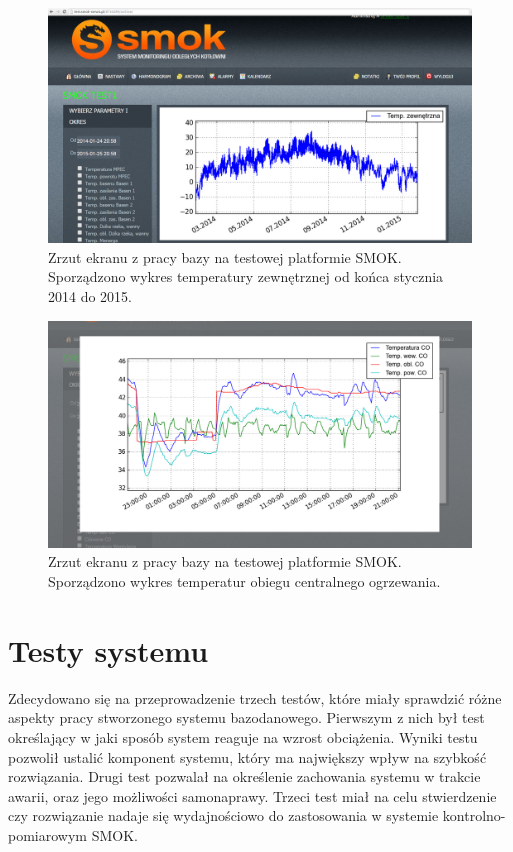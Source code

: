 \documentclass[a4paper,polish,12pt,twoside]{article}
\def \docsection#1{\clearpage\section{#1}}
\begin{document}
	\begin{figure}[H]
		\centering \includegraphics[width=15cm]{smokscreenshot2}
		\caption[Zrzut ekranu z pracy bazy na testowej platformie SMOK]{Zrzut ekranu z pracy bazy na testowej platformie SMOK. Sporządzono wykres temperatury zewnętrznej od końca stycznia 2014 do 2015.}
		\label{fig:smokscreenshot2}
	\end{figure}

	\begin{figure}[H]
		\centering \includegraphics[width=15cm]{smokscreenshot3}
		\caption[Zrzut ekranu z pracy bazy na testowej platformie SMOK]{Zrzut ekranu z pracy bazy na testowej platformie SMOK. Sporządzono wykres temperatur obiegu centralnego ogrzewania.}
		\label{fig:smokscreenshot3}
	\end{figure}

	\docsection{Testy systemu}

Zdecydowano się na przeprowadzenie trzech testów, które miały sprawdzić różne aspekty pracy stworzonego systemu bazodanowego. Pierwszym z nich był test określający w jaki sposób system reaguje na wzrost obciążenia. Wyniki testu pozwolił ustalić komponent systemu, który ma największy wpływ na szybkość rozwiązania.
Drugi test pozwalał na określenie zachowania systemu w trakcie awarii, oraz jego możliwości samonaprawy. Trzeci test miał na celu stwierdzenie czy rozwiązanie nadaje się wydajnościowo do zastosowania w systemie kontrolno-pomiarowym SMOK.
\end{document}
